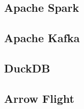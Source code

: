 
\subsection{Apache Spark}


\subsection{Apache Kafka}


\subsection{DuckDB}


\subsection{Arrow Flight}

